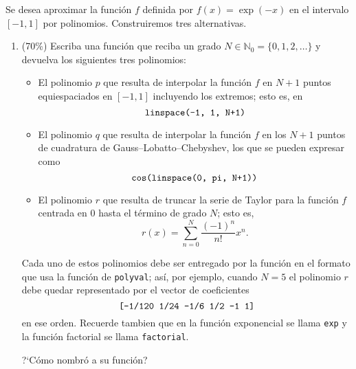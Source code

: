 Se desea aproximar la funci\'on $f$ definida por $f(x) = \exp(-x)$ en el intervalo $[-1,1]$ por polinomios.
Construiremos tres alternativas.

\begin{enumerate}
\item\label{it:three_polynomials_N} (70\%) Escriba una funci\'on \matlab que reciba un grado $N \in \mathbb{N}_0 = \{0, 1, 2, \dotsc \}$ y
devuelva los siguientes tres polinomios:
\begin{itemize}
\item El polinomio $p$ que resulta de interpolar la funci\'on $f$ en $N+1$ puntos equiespaciados en $[-1,1]$ incluyendo los extremos; esto es, en
%
\begin{equation*}
\text{\texttt{linspace(-1, 1, N+1)}}
\end{equation*}
%
\item El polinomio $q$ que resulta de interpolar la funci\'on $f$ en los $N+1$ puntos de cuadratura de Gauss--Lobatto--Chebyshev, los que se pueden expresar como
%
\begin{equation*}
\text{\texttt{cos(linspace(0, pi, N+1))}}
\end{equation*}
%
\item El polinomio $r$ que resulta de truncar la serie de Taylor para la funci\'on $f$ centrada en $0$ hasta el t\'ermino de grado $N$; esto es,
%
\begin{equation*}
r(x) = \sum_{n=0}^N \frac{(-1)^n}{n!} x^n.
\end{equation*}
%
\end{itemize}
%
Cada uno de estos polinomios debe ser entregado por la funci\'on en el formato que usa la funci\'on de \matlab \texttt{polyval}; as\'i, por ejemplo, cuando $N = 5$ el polinomio $r$ debe quedar representado por el vector de coeficientes
%
\begin{equation*}
\text{\texttt{[-1/120  1/24  -1/6  1/2  -1  1]}}
\end{equation*}
%
en ese orden. Recuerde tambien que en \matlab la funci\'on exponencial se llama \texttt{exp} y la funci\'on factorial se llama \texttt{factorial}.

\medskip
\noindent ?`C\'omo nombr\'o a su funci\'on?\newline
{}


\end{enumerate}
